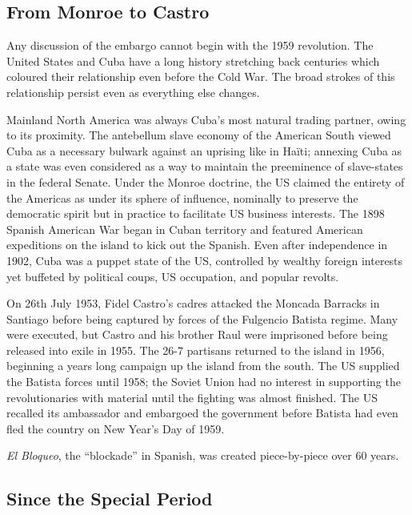 \documentclass[letterpaper,12pt,twoside]{article} %
\begin{document}
\begin{multicols}{2}

\section*{From Monroe to Castro}

Any discussion of the embargo cannot begin with the 1959 revolution. The United States and Cuba have a long history stretching back centuries which coloured their relationship even before the Cold War. The broad strokes of this relationship persist even as everything else changes.

Mainland North America was always Cuba's most natural trading partner, owing to its proximity. The antebellum slave economy of the American South viewed Cuba as a necessary bulwark against an uprising like in Haïti; annexing Cuba as a state was even considered as a way to maintain the preeminence of slave-states in the federal Senate. Under the Monroe doctrine, the US claimed the entirety of the Americas as under its sphere of influence, nominally to preserve the democratic spirit but in practice to facilitate US business interests. The 1898 Spanish American War began in Cuban territory and featured American expeditions on the island to kick out the Spanish. Even after independence in 1902, Cuba was a puppet state of the US, controlled by wealthy foreign interests yet buffeted by political coups, US occupation, and popular revolts.

On 26th July 1953, Fidel Castro's cadres attacked the Moncada Barracks in Santiago before being captured by forces of the Fulgencio Batista regime. Many were executed, but Castro and his brother Raul were imprisoned before being released into exile in 1955. The 26-7 partisans returned to the island in 1956, beginning a years long campaign up the island from the south. The US supplied the Batista forces until 1958; the Soviet Union had no interest in supporting the revolutionaries with material until the fighting was almost finished.\autocite{samson2008soviets} The US recalled its ambassador and embargoed the government before Batista had even fled the country on New Year's Day of 1959.

\textit{El Bloqueo}, the ``blockade'' in Spanish, was created piece-by-piece over 60 years.

\subsection*{Since the Special Period}


\end{multicols}
\end{document}
